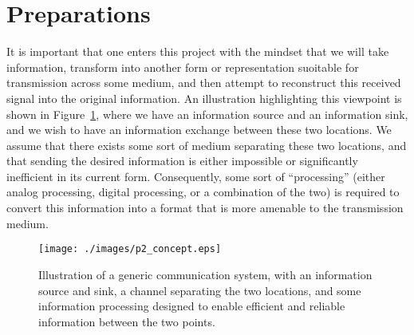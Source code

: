 \documentclass[letterpaper,12pt]{article}
\begin{document}
\section{Preparations}\label{s:prep}

It is important that one enters this project with the mindset that we will take information, transform into another form or representation suoitable for transmission across some medium, and then attempt to reconstruct
this received signal into the original information.  An illustration highlighting this viewpoint is shown in Figure~\ref{f:p2_concept}, where we have an information source and an information sink, and we wish to have an information
exchange between these two locations.  We assume that there exists some sort of medium separating these two locations, and that sending the desired information is either impossible or significantly inefficient in its 
current form.  Consequently, some sort of ``processing'' (either analog processing, digital processing, or a combination of the two) is required to convert this information into a format that is more amenable to the
transmission medium.
\begin{figure}[h]
 \centering
 \texttt{[image: ./images/p2\_concept.eps]}
 \caption{Illustration of a generic communication system, with an information source and sink, a channel separating the two locations, and some information processing designed to enable efficient and reliable information between the two points.}\label{f:p2_concept}
\end{figure}
\end{document}
